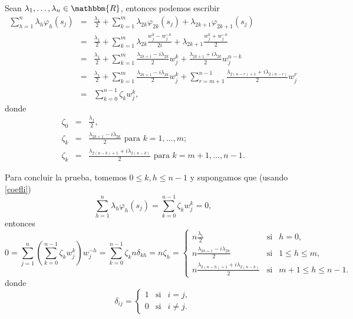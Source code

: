 \documentclass[a4paper,10pt]{book}
\newcommand{\R}{\mathbbm{R}}
\begin{document}
Sean $\lambda_1,\ldots,\lambda_n\in\R$, entonces podemos escribir
\begin{equation}\label{coefli}
    \begin{array}{rcl}
    \displaystyle\sum_{h=1}^n\lambda_h\varphi_h(s_j)&=&\frac{\lambda_1}{2}+\displaystyle\sum_{k=1}^m\lambda_{2k}\varphi_{2k}(s_j)+\lambda_{2k+1}\varphi_{2k+1}(s_j)\\
     &=&\frac{\lambda_1}{2}+\displaystyle\sum_{k=1}^m\lambda_{2k}\frac{w_j^k-w_j^{-k}}{2i}+\lambda_{2k+1}\frac{w_j^k+w_j^{-k}}{2}\\
     &=&\frac{\lambda_1}{2}+\displaystyle\sum_{k=1}^m\frac{\lambda_{2k+1}-i\lambda_{2k}}{2}w_j^k+\frac{\lambda_{2k+1}+i\lambda_{2k}}{2}w_j^{n-k}\\
     &=&\frac{\lambda_1}{2}+\displaystyle\sum_{k=1}^m\frac{\lambda_{2k+1}-i\lambda_{2k}}{2}w_j^k+\displaystyle\sum_{r=m+1}^{n-1}\frac{\lambda_{2(n-r)+1}+i\lambda_{2(n-r)}}{2}w_j^r\\
     &=&\displaystyle\sum_{k=0}^{n-1}\zeta_kw_j^k,
    \end{array}
\end{equation}
donde
\begin{equation*}
    \begin{array}{rcl}
    \zeta_0&=&\frac{\lambda_1}{2},\\
    \zeta_k&=&\frac{\lambda_{2k+1}-i\lambda_{2k}}{2}\mbox{ para }k=1,\ldots,m;\\
    \zeta_k&=&\frac{\lambda_{2(n-k)+1}+i\lambda_{2(n-k)}}{2}\mbox{ para }k=m+1,\ldots,n-1.
    \end{array}
\end{equation*}

Para concluir la prueba, tomemos $0\leq k,h\leq n-1$ y supongamos que (usando \eqref{coefli}) $$\displaystyle\sum_{h=1}^n\lambda_h\varphi_h(s_j)=\displaystyle\sum_{k=0}^{n-1}\zeta_kw_j^k=0,$$
entonces
\begin{equation*}
    0=\displaystyle\sum_{j=1}^n\left(\displaystyle\sum_{k=0}^{n-1}\zeta_kw_j^k\right)w_j^{-h}=\displaystyle\sum_{k=0}^{n-1}\zeta_kn\delta_{kh}=n\zeta_h=\left\{\begin{array}{lcl}
     n\frac{\lambda_1}{2}&\mbox{si}&h=0,\\
     n\frac{\lambda_{2h+1}-i\lambda_{2h}}{2}&\mbox{si}&1\leq h\leq m,\\
     n\frac{\lambda_{2(n-h)+1}+i\lambda_{2(n-h)}}{2}&\mbox{si}&m+1\leq h\leq n-1.
\end{array}\right.
\end{equation*}
donde 
\begin{equation*}
    \delta_{ij}=\left\{\begin{array}{lcl}
        1&\mbox{si}&i=j,  \\
        0&\mbox{si}&i\neq j.
    \end{array}\right.
\end{equation*}
\end{document}
